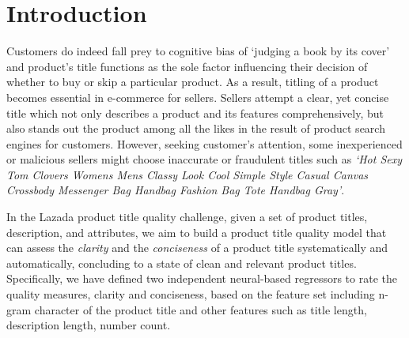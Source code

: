 \documentclass[sigconf]{acmart}
\begin{document}
%
%



\maketitle

\section{Introduction}
Customers do indeed fall prey to cognitive bias of `judging a book by its cover' and product's title functions as the sole factor influencing their decision of whether to buy or skip a particular product. As a result, titling of a product becomes essential in e-commerce for sellers. Sellers attempt a clear, yet concise title which not only describes a product and its features comprehensively, but also stands out the product among all the likes in the result of product search engines for customers. However, seeking customer's attention, some inexperienced or malicious sellers might choose inaccurate or fraudulent titles such as \textit{`Hot Sexy Tom Clovers Womens Mens Classy Look Cool Simple Style Casual Canvas Crossbody Messenger Bag Handbag Fashion Bag Tote Handbag Gray'}. 

In the Lazada product title quality challenge, given a set of product titles, description, and attributes, we aim to build a product title quality model that can assess the \textit{clarity} and the \textit{conciseness} of a product title systematically and automatically, concluding to a state of clean and relevant product titles. Specifically, we have defined two independent neural-based regressors to rate the quality measures, clarity and conciseness, based on the feature set including n-gram character of the product title and other features such as title length, description length, number count. 

\end{document}
